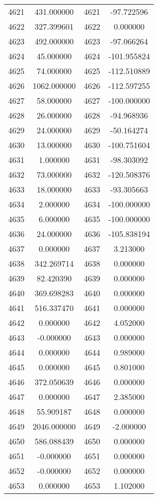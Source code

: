 \documentclass[12pt]{article}
\begin{document}
\begin{longtable}{@{}cccc@{}}
4621 & 431.000000 & 4621 & -97.722596 \\
4622 & 327.399601 & 4622 & 0.000000 \\
4623 & 492.000000 & 4623 & -97.066264 \\
4624 & 45.000000 & 4624 & -101.955824 \\
4625 & 74.000000 & 4625 & -112.510889 \\
4626 & 1062.000000 & 4626 & -112.597255 \\
4627 & 58.000000 & 4627 & -100.000000 \\
4628 & 26.000000 & 4628 & -94.968936 \\
4629 & 24.000000 & 4629 & -50.164274 \\
4630 & 13.000000 & 4630 & -100.751604 \\
4631 & 1.000000 & 4631 & -98.303092 \\
4632 & 73.000000 & 4632 & -120.508376 \\
4633 & 18.000000 & 4633 & -93.305663 \\
4634 & 2.000000 & 4634 & -100.000000 \\
4635 & 6.000000 & 4635 & -100.000000 \\
4636 & 24.000000 & 4636 & -105.838194 \\
4637 & 0.000000 & 4637 & 3.213000 \\
4638 & 342.269714 & 4638 & 0.000000 \\
4639 & 82.420390 & 4639 & 0.000000 \\
4640 & 369.698283 & 4640 & 0.000000 \\
4641 & 516.337470 & 4641 & 0.000000 \\
4642 & 0.000000 & 4642 & 4.052000 \\
4643 & -0.000000 & 4643 & 0.000000 \\
4644 & 0.000000 & 4644 & 0.989000 \\
4645 & 0.000000 & 4645 & 0.801000 \\
4646 & 372.050639 & 4646 & 0.000000 \\
4647 & 0.000000 & 4647 & 2.385000 \\
4648 & 55.909187 & 4648 & 0.000000 \\
4649 & 2046.000000 & 4649 & -2.000000 \\
4650 & 586.088439 & 4650 & 0.000000 \\
4651 & -0.000000 & 4651 & 0.000000 \\
4652 & -0.000000 & 4652 & 0.000000 \\
4653 & 0.000000 & 4653 & 1.102000 \\

\end{longtable}
\end{document}
